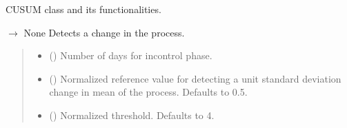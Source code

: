 \documentclass[letterpaper,10pt,oneside,english]{sphinxmanual}
\begin{document}
\begin{fulllineitems}
\label{\detokenize{ref_cusum:package.cusum.CUSUM}}
\pysigstartsignatures
\pysigline
{}
\pysigstopsignatures
\sphinxAtStartPar
CUSUM class and its functionalities.

\begin{fulllineitems}
\label{\detokenize{ref_cusum:package.cusum.CUSUM.change_detection}}
\pysigstartsignatures
\pysiglinewithargsret
{}
{\sphinxparamcomma {}}
{{ $\rightarrow$ None}}
\pysigstopsignatures
\sphinxAtStartPar
Detects a change in the process.
\begin{quote}\begin{description}
\begin{itemize}
\item {} 
\sphinxAtStartPar
{} () \textendash{} Number of days for in\sphinxhyphen{}control phase.

\item {} 
\sphinxAtStartPar
{} (\sphinxstyleliteralemphasis{\sphinxupquote{, }}) \textendash{} Normalized reference value for detecting a unit standard deviation change in mean of the process. Defaults to 0.5.

\item {} 
\sphinxAtStartPar
{} (\sphinxstyleliteralemphasis{\sphinxupquote{, }}) \textendash{} Normalized threshold. Defaults to 4.

\end{itemize}


\end{description}
\end{quote}
\end{fulllineitems}
\end{fulllineitems}
\end{document}
